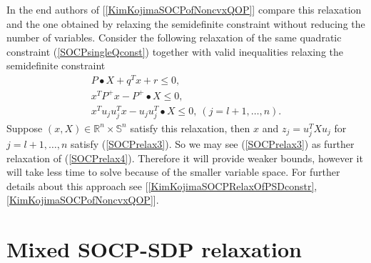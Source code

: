\documentclass[12pt]{book}
\theoremstyle{definition}
\begin{document}
In the end authors of [\ref{KimKojimaSOCPofNoncvxQOP}] compare this relaxation and the one obtained by relaxing the semidefinite constraint without reducing the number of variables.  Consider the following relaxation of the same quadratic constraint (\ref{SOCPsingleQconst})
together with valid inequalities relaxing the semidefinite constraint
\begin{equation}
\begin{array}{l}
\label{SOCPrelax4}
P\bullet X + q^Tx + r \leq 0,\\
x^TP^+x - P^+\bullet X \leq 0, \\
x^Tu_ju_j^Tx - u_ju_j^T\bullet X \leq 0, \ (j = l+1,\dots ,n).
\end{array}
\end{equation}
Suppose $(x,X) \in \mathbb{R}^n\times \mathbb{S}^n$ satisfy this relaxation, then $x$ and $z_j = u_j^TXu_j$ for $j = l+1,\dots ,n$ satisfy (\ref{SOCPrelax3}). So we may see (\ref{SOCPrelax3}) as further relaxation of (\ref{SOCPrelax4}).
Therefore it will provide weaker bounds, however it will take less time to solve because of the smaller variable space.  
For further details about this approach see  [\ref{KimKojimaSOCPRelaxOfPSDconstr}, \ref{KimKojimaSOCPofNoncvxQOP}].



\section{Mixed SOCP-SDP relaxation}
\label{SectionMixedSocpSDP}
\end{document}
